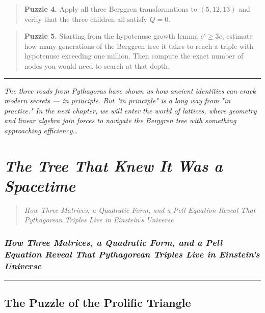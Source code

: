 \documentclass[11pt,openany]{book}
\theoremstyle{definition}
\theoremstyle{plain}
\theoremstyle{remark}
\begin{document}
\begin{quote}
\textbf{Puzzle 4.} Apply all three Berggren transformations to $(5, 12, 13)$ and verify that the three children all satisfy $Q = 0$.
\end{quote}


\begin{quote}
\textbf{Puzzle 5.} Starting from the hypotenuse growth lemma $c' \geq 3c$, estimate how many generations of the Berggren tree it takes to reach a triple with hypotenuse exceeding one million. Then compute the exact number of nodes you would need to search at that depth.
\end{quote}


\bigskip\noindent\rule{\textwidth}{0.4pt}\bigskip


\textit{The three roads from Pythagoras have shown us how ancient identities can crack modern secrets — in principle. But "in principle" is a long way from "in practice." In the next chapter, we will enter the world of lattices, where geometry and linear algebra join forces to navigate the Berggren tree with something approaching efficiency…}

\clearpage

\chapter{\textit{The Tree That Knew It Was a Spacetime}}
\begin{quote}\textit{How Three Matrices, a Quadratic Form, and a Pell Equation Reveal That Pythagorean Triples Live in Einstein's Universe}\end{quote}



\subsection*{\textit{How Three Matrices, a Quadratic Form, and a Pell Equation Reveal That Pythagorean Triples Live in Einstein's Universe}}


\bigskip\noindent\rule{\textwidth}{0.4pt}\bigskip


\section*{The Puzzle of the Prolific Triangle}
\end{document}
